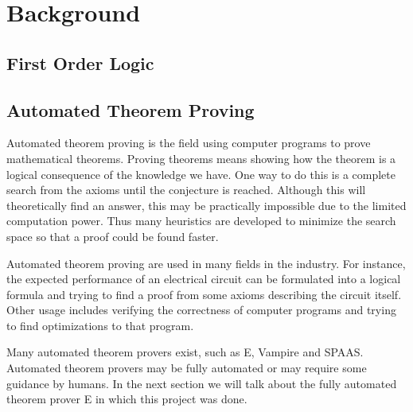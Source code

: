 \chapter{Background}\label{chap:background}

\section{First Order Logic}
\section{Automated Theorem Proving}
Automated theorem proving is the field using computer programs to prove mathematical theorems. Proving theorems means showing how the theorem is a logical consequence of the knowledge we have. One way to do this is a complete search from the axioms until the conjecture is reached. Although this will theoretically find an answer, this may be practically impossible due to the limited computation power. Thus many heuristics are developed to minimize the search space so that a proof could be found faster.

Automated theorem proving are used in many fields in the industry. For instance, the expected performance of an electrical circuit can be formulated into a logical formula and trying to find a proof from some axioms describing the circuit itself. Other usage includes verifying the correctness of computer programs and trying to find optimizations to that program.

Many automated theorem provers exist, such as E, Vampire and SPAAS. Automated theorem provers may be fully automated or may require some guidance by humans. In the next section we will talk about the fully automated theorem prover E in which this project was done.

